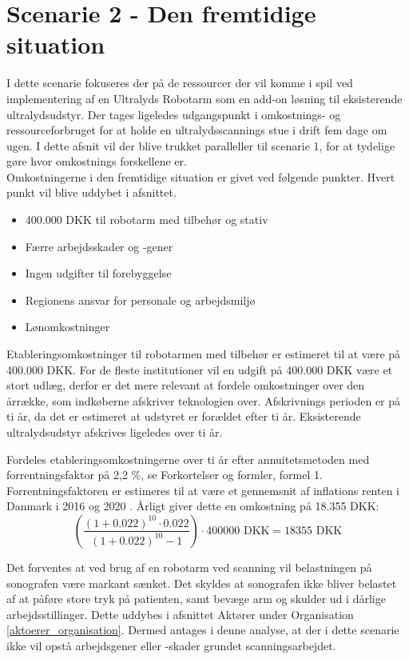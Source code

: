 \section{Scenarie 2 - Den fremtidige situation}
I dette scenarie fokuseres der på de ressourcer der vil komme i spil ved implementering af en Ultralyds Robotarm som en add-on løsning til eksisterende ultralydsudstyr. Der tages ligeledes udgangspunkt i omkostnings- og ressourceforbruget for at holde en ultralydsscannings stue i drift fem dage om ugen. I dette afsnit vil der blive trukket paralleller til scenarie 1, for at tydelige gøre hvor omkostnings forskellene er. \\
Omkostningerne i den fremtidige situation er givet ved følgende punkter. Hvert punkt vil blive uddybet i afsnittet.
\begin{itemize}
\item 400.000 DKK til robotarm med tilbehør og stativ
\item Færre arbejdsskader og -gener
\item Ingen udgifter til forebyggelse
\item Regionens ansvar for personale og arbejdsmiljø
\item Lønomkostninger
\end{itemize}
Etableringsomkostninger til robotarmen med tilbehør er estimeret til at være på 400.000 DKK. For de fleste institutioner vil en udgift på 400.000 DKK være et stort udlæg, derfor er det mere relevant at fordele omkostninger over den årrække, som indkøberne afskriver teknologien over. Afskrivnings perioden er på ti år, da det er estimeret at udstyret er forældet efter ti år. Eksisterende ultralydsudstyr afskrives ligeledes over ti år. 

Fordeles etableringsomkostningerne over ti år efter annuitetsmetoden med forrentningsfaktor på 2,2 \%, se Forkortelser og formler, formel 1. Forrentningsfaktoren er estimeres til at være et gennemsnit af inflations renten i Danmark i 2016 og 2020 \cite{inflation}. Årligt giver dette en omkostning på 18.355 DKK:
\begin{equation}
\left(\frac{(1+0.022)^{10}\cdot0.022}{(1+0.022)^{10}-1}\right)\cdot400000 \text{ DKK}=18355 \text{ DKK}
\end{equation}

Det forventes at ved brug af en robotarm ved scanning vil belastningen på sonografen være markant sænket. Det skyldes at sonografen ikke bliver belastet af at påføre store tryk på patienten, samt bevæge arm og skulder ud i dårlige arbejdsstillinger. Dette uddybes i afsnittet Aktører under Organisation \ref{aktoerer_organisation}. Dermed antages i denne analyse, at der i dette scenarie ikke vil opstå arbejdsgener eller -skader grundet scanningsarbejdet. 

